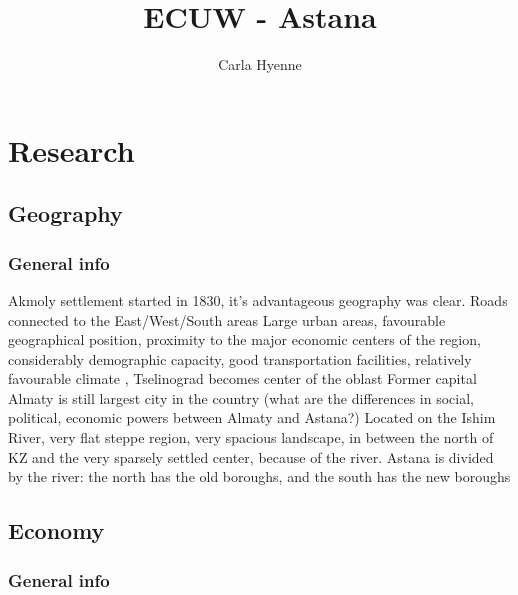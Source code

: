 \documentclass{article}
\title{ECUW - Astana}
\author{Carla Hyenne}
\begin{document}
\maketitle

\tableofcontents

\pagebreak

\section{Research}

\subsection{Geography}

\subsubsection{General info}

\begin{outline}
  \1 Akmoly settlement started in 1830, it's advantageous geography was clear. Roads connected to the East/West/South areas
  \1 Large urban areas, favourable geographical position, proximity to the major economic centers of the region, considerably demographic capacity, good transportation facilities, relatively favourable climate
  , Tselinograd becomes center of the oblast
  \1 Former capital Almaty is still largest city in the country (what are the differences in social, political, economic powers between Almaty and Astana?)
  \1 Located on the Ishim River, very flat steppe region, very spacious landscape, in between the north of KZ and the very sparsely settled center, because of the river. 
  \1 Astana is divided by the river: the north has the old boroughs, and the south has the new boroughs
\end{outline}

\subsection{Economy}

\subsubsection{General info}
\end{document}
